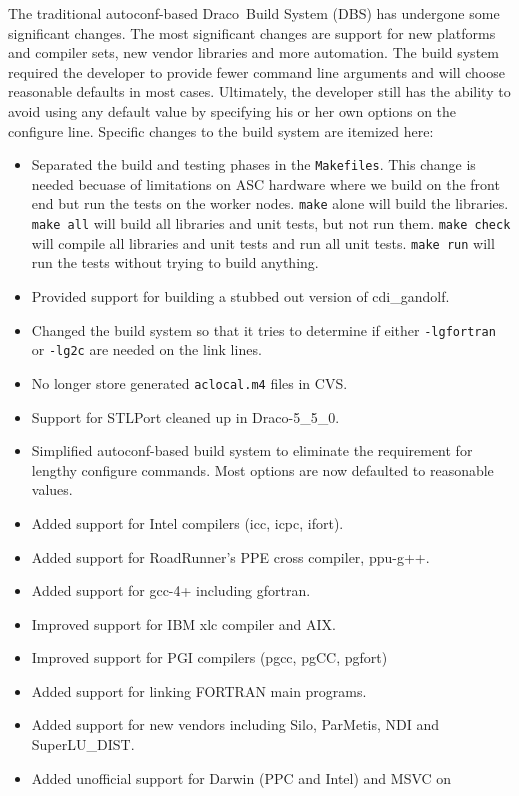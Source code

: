 \documentclass[note]{ResearchNote}
\newcommand{\draco}{Draco}
\newcommand{\CVS}{\textsf{CVS}}
\begin{document}
The traditional autoconf-based \draco\ Build System (DBS) has
undergone some significant changes.  The most significant changes are
support for new platforms and compiler sets, new vendor libraries and
more automation.  The build system required the developer to provide
fewer command line arguments and will choose reasonable defaults in
most cases.  Ultimately, the developer still has the ability to avoid
using any default value by specifying his or her own options on the
configure line.  Specific changes to the build system are itemized
here: 
\begin{itemize}
\item Separated the build and testing phases in the
  \texttt{Makefiles}.  This change is needed becuase of limitations on
  ASC hardware where we build on the front end but run the tests on
  the worker nodes.  \texttt{make} alone will build the libraries.
  \texttt{make all} will build all libraries and unit tests, but not
  run them.   \texttt{make check} will compile all libraries and unit
  tests and run all unit tests.  \texttt{make run} will run the tests
  without trying to build anything.
\item Provided support for building a stubbed out version of
  \textsf{cdi\_gandolf}.
\item Changed the build system so that it tries to determine if either
  \texttt{-lgfortran} or \texttt{-lg2c} are needed on the link lines.
\item No longer store generated \texttt{aclocal.m4} files in \CVS.
\item Support for STLPort cleaned up in \draco-5\_5\_0.
\item Simplified autoconf-based build system to eliminate the
  requirement for lengthy configure commands.  Most options are now
  defaulted to reasonable values.
\item Added support for Intel compilers (icc, icpc, ifort).
\item Added support for RoadRunner's PPE cross compiler, ppu-g++.
\item Added support for gcc-4+ including gfortran.
\item Improved support for IBM xlc compiler and AIX.
\item Improved support for PGI compilers (pgcc, pgCC, pgfort)
\item Added support for linking FORTRAN main programs.
\item Added support for new vendors including Silo, ParMetis, NDI and
  SuperLU\_DIST.
\item Added unofficial support for Darwin (PPC and Intel) and MSVC on

\end{itemize}
\end{document}
